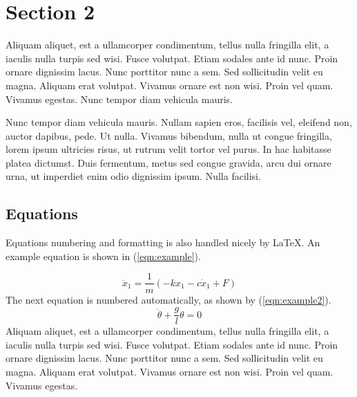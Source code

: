\documentclass[11pt]{article}
\begin{document}
\section{Section 2}
\label{sec:section_2_label}
\vspace{-0.2in}
%
Aliquam aliquet, est a ullamcorper condimentum, tellus nulla fringilla elit, a iaculis nulla turpis sed wisi. Fusce volutpat. Etiam sodales ante id nunc. Proin ornare dignissim lacus. Nunc porttitor nunc a sem. Sed sollicitudin velit eu magna. Aliquam erat volutpat. Vivamus ornare est non wisi. Proin vel quam. Vivamus egestas. Nunc tempor diam vehicula mauris. 

Nunc tempor diam vehicula mauris. Nullam sapien eros, facilisis vel, eleifend non, auctor dapibus, pede. Ut nulla. Vivamus bibendum, nulla ut congue fringilla, lorem ipsum ultricies risus, ut rutrum velit tortor vel purus. In hac habitasse platea dictumst. Duis fermentum, metus sed congue gravida, arcu dui ornare urna, ut imperdiet enim odio dignissim ipsum. Nulla facilisi. 


\subsection{Equations}
\label{sec:subsection_label}
\vspace{-0.2in}
%
Equations numbering and formatting is also handled nicely by \LaTeX. An example equation is shown in (\ref{eqn:example}).

%
\begin{equation}
\ddot{x}_1 = \frac{1}{m}\left(-k x_1 - c\dot{x}_1 + F\right)
\label{eqn:example}
\end{equation}
%
The next equation is numbered automatically, as shown by (\ref{eqn:example2}).
%
\begin{equation}
\ddot{\theta} + \frac{g}{l}\theta = 0
\label{eqn:example2}
\end{equation}
%
Aliquam aliquet, est a ullamcorper condimentum, tellus nulla fringilla elit, a iaculis nulla turpis sed wisi. Fusce volutpat. Etiam sodales ante id nunc. Proin ornare dignissim lacus. Nunc porttitor nunc a sem. Sed sollicitudin velit eu magna. Aliquam erat volutpat. Vivamus ornare est non wisi. Proin vel quam. Vivamus egestas. 


\end{document}
